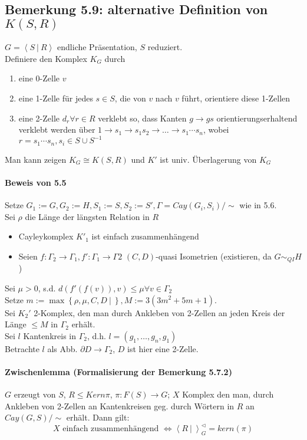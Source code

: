 \documentclass{article}
\newcommand{\set}[2]{\left\lbrace #1~|~#2 \right\rbrace}
\newcommand{\grp}[2]{\left\langle #1~|~#2 \right\rangle}
\begin{document}
\subsection{Bemerkung 5.9: alternative Definition von $K(S,R)$}
$G = \grp{S}{R}$ endliche Präsentation, $S$ reduziert.\\
Definiere den Komplex $K_G$ durch
\begin{enumerate}
	\item eine 0-Zelle $v$
	\item eine 1-Zelle für jedes $s \in S$, die von $v$ nach $v$ führt, orientiere diese 1-Zellen
	\item eine 2-Zelle $d_r \forall r \in R$ verklebt so, dass Kanten $g \rightarrow gs$ orientierungserhaltend verklebt werden über $1 \rightarrow s_1 \rightarrow s_1s_2 \rightarrow \ldots \rightarrow s_1\cdots s_n$, wobei $r = s_1\cdots s_n, s_i \in S\cup S^{-1}$
\end{enumerate}
Man kann zeigen $K_G \cong K(S,R)$ und $K'$ ist univ. Überlagerung von $K_G$

\paragraph{Beweis von 5.5}
Setze $G_1 := G, G_2 := H, S_1 := S, S_2 := S', \Gamma = Cay(G_i, S_i)/\sim$ wie in 5.6.\\

Sei $\rho$ die Länge der längsten Relation in $R$
\begin{itemize}
	\item Cayleykomplex $K'_1$ ist einfach zusammenhängend
	\item Seien $f:\Gamma_2 \rightarrow \Gamma_1, f' : \Gamma_1 \rightarrow \Gamma 2$ $(C,D)$-quasi Isometrien (existieren, da $G \sim_{QI} H$)
\end{itemize}
Sei $\mu > 0$, s.d. $d(f'(f(v)), v) \leq \mu \forall v \in \Gamma_2$\\
Setze $m:= \max \set{\rho, \mu, C,D}{}, M := 3(3m^2 + 5m + 1)$.\\
Sei $K_2'$ 2-Komplex, den man durch Ankleben von 2-Zellen an jeden Kreis der Länge $\leq M$ in $\Gamma_2$ erhält.\\

Sei $l$ Kantenkreis in $\Gamma_2$, d.h. $l = (g_1,\ldots, g_n, g_1)$\\
Betrachte $l$ als Abb. $\partial D \rightarrow \Gamma_2$, $D$ ist hier eine 2-Zelle.\\

\paragraph{Zwischenlemma (Formalisierung der Bemerkung 5.7.2)}
$G$ erzeugt von $S$, $R \leq Kern \pi$, $\pi : F(S) \rightarrow G$; $X$ Komplex den man, durch Ankleben von 2-Zellen an Kantenkreisen geg. durch Wörtern in $R$ an $Cay(G,S)/\sim$ erhält. Dann gilt:
\[X \text{ einfach zusammenhängend } \Longleftrightarrow \grp{R}{}_G^\vartriangleleft = kern(\pi)  \]
\end{document}

